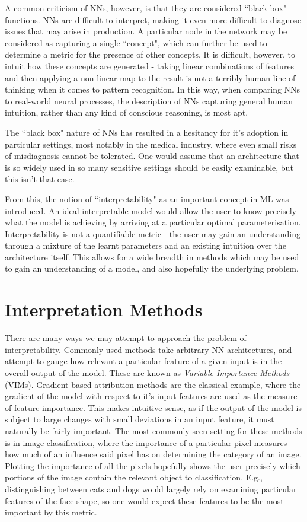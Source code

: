 \documentclass[conference]{report}
\begin{document}
A common criticism of NNs, however, is that they are considered ``black box" functions. NNs are difficult to interpret, making it even more difficult to diagnose issues that may arise in production. A particular node in the network may be considered as capturing a single ``concept", which can further be used to determine a metric for the presence of other concepts. It is difficult, however, to intuit how these concepts are generated - taking linear combinations of features and then applying a non-linear map to the result is not a terribly human line of thinking when it comes to pattern recognition. In this way, when comparing NNs to real-world neural processes, the description of NNs capturing general human intuition, rather than any kind of conscious reasoning, is most apt.

The ``black box" nature of NNs has resulted in a hesitancy for it's adoption in particular settings, most notably in the medical industry, where even small risks of misdiagnosis cannot be tolerated. One would assume that an architecture that is so widely used in so many sensitive settings should be easily examinable, but this isn't that case.

From this, the notion of ``interpretability" as an important concept in ML was introduced. An ideal interpretable model would allow the user to know precisely what the model is achieving by arriving at a particular optimal parameterisation. Interpretability is not a quantifiable metric - the user may gain an understanding through a mixture of the learnt parameters and an existing intuition over the architecture itself. This allows for a wide breadth in methods which may be used to gain an understanding of a model, and also hopefully the underlying problem.

\section{Interpretation Methods}

There are many ways we may attempt to approach the problem of interpretability. Commonly used methods take arbitrary NN architectures, and attempt to gauge how relevant a particular feature of a given input is in the overall output of the model. These are known as \textit{Variable Importance Methods} (VIMs). Gradient-based attribution methods \cite{gradientattribute} are the classical example, where the gradient of the model with respect to it's input features are used as the measure of feature importance. This makes intuitive sense, as if the output of the model is subject to large changes with small deviations in an input feature, it must naturally be fairly important. The most commonly seen setting for these methods is in image classification, where the importance of a particular pixel measures how much of an influence said pixel has on determining the category of an image. Plotting the importance of all the pixels hopefully shows the user precisely which portions of the image contain the relevant object to classification. E.g., distinguishing between cats and dogs would largely rely on examining particular features of the face shape, so one would expect these features to be the most important by this metric.
\end{document}
